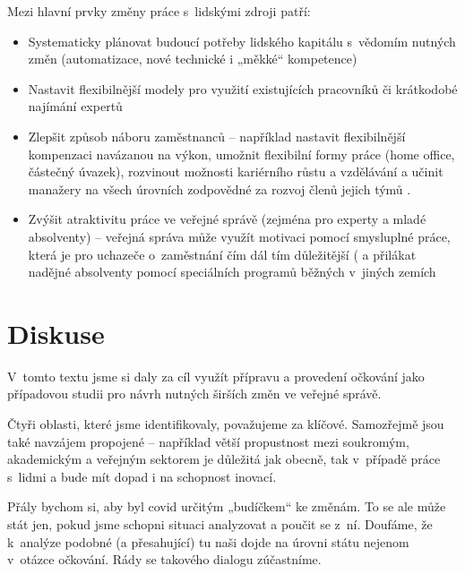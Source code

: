 Mezi hlavní prvky změny práce s~lidskými zdroji patří:

\begin{itemize}
  \item Systematicky plánovat budoucí potřeby lidského kapitálu s~vědomím nutných změn (automatizace, nové technické i „měkké“ kompetence)
  \item Nastavit flexibilnější modely pro využití existujících pracovníků či krátkodobé najímání expertů
  \item Zlepšit způsob náboru zaměstnanců -- například nastavit flexibilnější kompenzaci navázanou na výkon, umožnit flexibilní formy práce (home office, částečný úvazek), rozvinout možnosti kariérního růstu a vzdělávání a učinit manažery na všech úrovních zodpovědné za rozvoj členů jejich týmů \cite{thomas_finding_2021, mckinsey_desetileti_2021}.
  \item  Zvýšit atraktivitu práce ve veřejné správě (zejména pro experty a mladé absolventy) -- veřejná správa může využít motivaci pomocí smysluplné práce, která je pro uchazeče o~zaměstnání čím dál tím důležitější (\cite{achor_9_2018} a přilákat nadějné absolventy pomocí speciálních programů běžných v~jiných zemích \cite{noauthor_home_2020, mckinsey_desetileti_2021}
\end{itemize}

\section*{Diskuse}

V~tomto textu jsme si daly za cíl využít přípravu a provedení očkování jako pří\-pa\-do\-vou studii pro návrh nutných širších změn ve veřejné správě.

Čtyři oblasti, které jsme identifikovaly, považujeme za klíčové. Samozřejmě jsou také navzájem propojené -- například větší propustnost mezi soukromým, akademickým a veřejným sektorem je důležitá jak obecně, tak v~případě práce s~lidmi a bude mít dopad i na schopnost inovací.

Přály bychom si, aby byl covid určitým „budíčkem“ ke změnám. To se ale může stát jen, pokud jsme schopni situaci analyzovat a poučit se z~ní. Doufáme, že k~analýze podobné (a přesahující) tu naši dojde na úrovni státu nejenom v~otázce očkování. Rády se takového dialogu zúčastníme.

